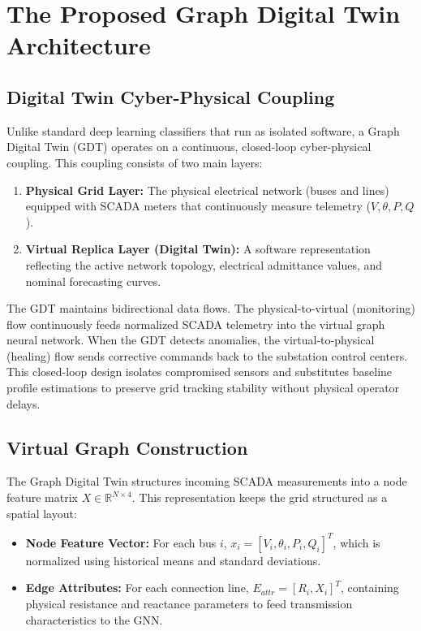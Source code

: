 \documentclass[journal]{IEEEtran}
\begin{document}
\section{The Proposed Graph Digital Twin Architecture}

\subsection{Digital Twin Cyber-Physical Coupling}
Unlike standard deep learning classifiers that run as isolated software, a Graph Digital Twin (GDT) operates on a continuous, closed-loop cyber-physical coupling. This coupling consists of two main layers:
\begin{enumerate}
    \item \textbf{Physical Grid Layer:} The physical electrical network (buses and lines) equipped with SCADA meters that continuously measure telemetry ($V, \theta, P, Q$).
    \item \textbf{Virtual Replica Layer (Digital Twin):} A software representation reflecting the active network topology, electrical admittance values, and nominal forecasting curves.
\end{enumerate}
The GDT maintains bidirectional data flows. The physical-to-virtual (monitoring) flow continuously feeds normalized SCADA telemetry into the virtual graph neural network. When the GDT detects anomalies, the virtual-to-physical (healing) flow sends corrective commands back to the substation control centers. This closed-loop design isolates compromised sensors and substitutes baseline profile estimations to preserve grid tracking stability without physical operator delays.

\subsection{Virtual Graph Construction}
The Graph Digital Twin structures incoming SCADA measurements into a node feature matrix $X \in \mathbb{R}^{N \times 4}$. This representation keeps the grid structured as a spatial layout:
\begin{itemize}
    \item \textbf{Node Feature Vector:} For each bus $i$, $x_i = [V_i, \theta_i, P_i, Q_i]^T$, which is normalized using historical means and standard deviations.
    \item \textbf{Edge Attributes:} For each connection line, $E_{attr} = [R_i, X_i]^T$, containing physical resistance and reactance parameters to feed transmission characteristics to the GNN.
\end{itemize}
\end{document}
